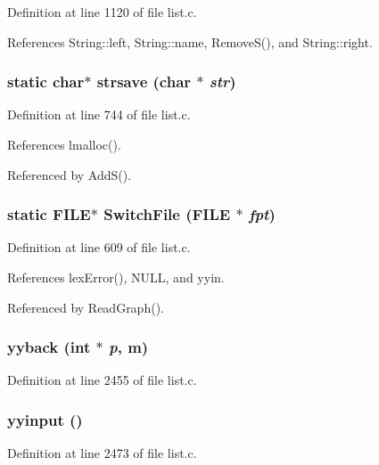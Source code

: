 Definition at line 1120 of file list.c.

References String::left, String::name, Remove\-S(), and String::right.
\subsubsection{\setlength{\rightskip}{0pt plus 5cm}static char$\ast$ strsave (char $\ast$ {\em str})\hspace{0.3cm}{\tt  [static]}}\label{list_8c_ef71b190c2a5ff9efc175eb002a20c0c}




Definition at line 744 of file list.c.

References lmalloc().

Referenced by Add\-S().
\subsubsection{\setlength{\rightskip}{0pt plus 5cm}static FILE$\ast$ Switch\-File (FILE $\ast$ {\em fpt})\hspace{0.3cm}{\tt  [static]}}\label{list_8c_ad4d6ccb475e09380a86ee120c423d55}




Definition at line 609 of file list.c.

References lex\-Error(), NULL, and yyin.

Referenced by Read\-Graph().
\subsubsection{\setlength{\rightskip}{0pt plus 5cm}yyback (int $\ast$ {\em p}, m)}\label{list_8c_7e7fd61eff95f28431f23795998f2c8e}




Definition at line 2455 of file list.c.
\subsubsection{\setlength{\rightskip}{0pt plus 5cm}yyinput ()}\label{list_8c_4899c6bb0b1b5863637b480d7901f4ae}




Definition at line 2473 of file list.c.

